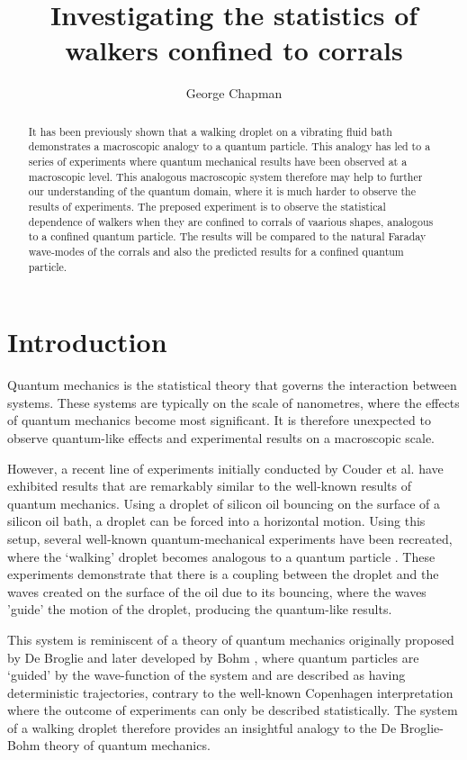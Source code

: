 \documentclass[11pt]{article}
\author{George Chapman}
\title{Investigating the statistics of walkers confined to corrals}
\begin{document}
\maketitle

\begin{abstract}
It has been previously shown that a walking droplet on a vibrating fluid bath demonstrates a macroscopic analogy to a quantum particle.  This analogy has led to a series of experiments where quantum mechanical results have been observed at a macroscopic level.  This analogous macroscopic system therefore may help to further our understanding of the quantum domain, where it is much harder to observe the results of experiments.  The preposed experiment is to observe the statistical dependence of walkers when they are confined to corrals of vaarious shapes, analogous to a confined quantum particle.  The results will be compared to the natural Faraday wave-modes of the corrals and also the predicted results for a confined quantum particle.
\end{abstract}

\section{Introduction}
\label{sec:introduction}

Quantum mechanics is the statistical theory that governs the interaction between systems.  These systems are typically on the scale of nanometres, where the effects of quantum mechanics become most significant.  It is therefore unexpected to observe quantum-like effects and experimental results on a macroscopic scale.

However, a recent line of experiments initially conducted by Couder et al.\cite{1} have exhibited results that are remarkably similar to the well-known results of quantum mechanics.  Using a droplet of silicon oil bouncing on the surface of a silicon oil bath, a droplet can be forced into a horizontal motion.  Using this setup, several well-known quantum-mechanical experiments have been recreated, where the `walking' droplet becomes analogous to a quantum particle \cite{1,6,7}.  These experiments demonstrate that there is a coupling between the droplet and the waves created on the surface of the oil due to its bouncing, where the waves 'guide' the motion of the droplet, producing the quantum-like results.

This system is reminiscent of a theory of quantum mechanics originally proposed by De Broglie and later developed by Bohm \cite{17}, where quantum particles are `guided' by the wave-function of the system and are described as having deterministic trajectories, contrary to the well-known Copenhagen interpretation where the outcome of experiments can only be described statistically.  The system of a walking droplet therefore provides an insightful analogy to the De Broglie-Bohm theory of quantum mechanics.
\end{document}
